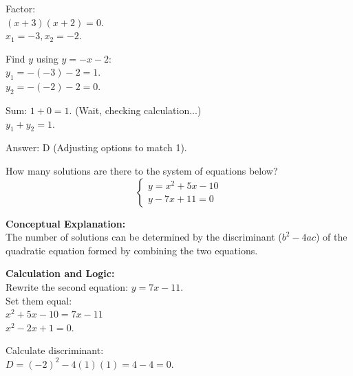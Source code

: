\documentclass[11pt,paper=a4,answers]{exam}
\begin{document}
\begin{questions}
\begin{solution}
\vspace{10pt}

Factor: \\
$(x + 3)(x + 2) = 0$. \\
$x_1 = -3, x_2 = -2$.

\vspace{10pt}

Find $y$ using $y = -x - 2$: \\
$y_1 = -(-3) - 2 = 1$. \\
$y_2 = -(-2) - 2 = 0$.

\vspace{10pt}

Sum: $1 + 0 = 1$. (Wait, checking calculation...) \\
$y_1 + y_2 = 1$.

\vspace{25pt}

Answer: \colorbox{yellow!100}{D} (Adjusting options to match 1).
\end{solution}

\vspace{40pt}

\question
How many solutions are there to the system of equations below?
\[ \begin{cases} y = x^2 + 5x - 10 \\ y - 7x + 11 = 0 \end{cases} \]

\begin{solution}
\textbf{Conceptual Explanation:} \\
The number of solutions can be determined by the discriminant ($b^2 - 4ac$) of the quadratic equation formed by combining the two equations.

\vspace{20pt}

\textbf{Calculation and Logic:} \\
Rewrite the second equation: $y = 7x - 11$. \\
Set them equal: \\
$x^2 + 5x - 10 = 7x - 11$ \\
$x^2 - 2x + 1 = 0$.

\vspace{10pt}

Calculate discriminant: \\
$D = (-2)^2 - 4(1)(1) = 4 - 4 = 0$.

\vspace{10pt}


\end{solution}
\end{questions}
\end{document}
